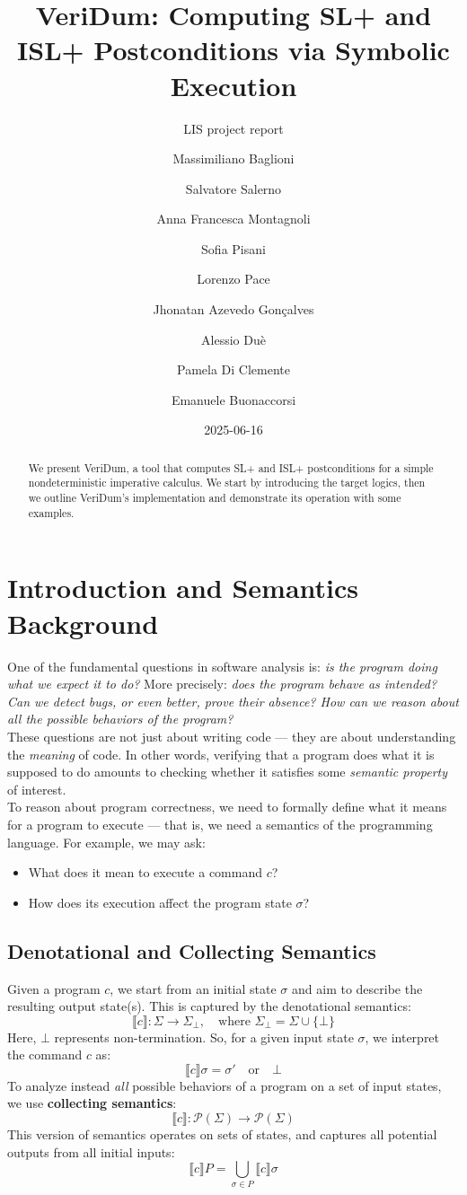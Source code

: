 \documentclass[parskip=half]{scrartcl}
\title{VeriDum: Computing SL+ and ISL+ Postconditions via Symbolic Execution}
\subtitle{LIS project report}
\date{2025-06-16}
\author{ %
  Massimiliano Baglioni      \and
  Salvatore Salerno          \and
  Anna Francesca Montagnoli  \and
  Sofia Pisani               \and
  Lorenzo Pace               \and
  Jhonatan Azevedo Gonçalves \and
  Alessio Duè                \and
  Pamela Di Clemente         \and
  Emanuele Buonaccorsi}
\begin{document}
\maketitle

\begin{abstract}
  We present VeriDum, a tool that computes SL+ and ISL+ postconditions for a simple nondeterministic imperative calculus. We start by introducing the target logics, then we outline VeriDum's implementation and demonstrate its operation with some examples.
\end{abstract}

\section{Introduction and Semantics Background}

One of the fundamental questions in software analysis is: \emph{is the program doing what we expect it to do?} More precisely: \emph{does the program behave as intended? Can we detect bugs, or even better, prove their absence? How can we reason about all the possible behaviors of the program?}
\\ These questions are not just about writing code — they are about understanding the \emph{meaning} of code. In other words, verifying that a program does what it is supposed to do amounts to checking whether it satisfies some \emph{semantic property} of interest.
\\ To reason about program correctness, we need to formally define what it means for a program to execute — that is, we need a semantics of the programming language. For example, we may ask:
\begin{itemize}
    \item What does it mean to execute a command \( c \)?
    \item How does its execution affect the program state \( \sigma \)?
\end{itemize}

\subsection{Denotational and Collecting Semantics}
Given a program \( c \), we start from an initial state \( \sigma \) and aim to describe the resulting output state(s). This is captured by the denotational semantics:
\[
\llbracket c \rrbracket : \Sigma \rightarrow \Sigma_{\bot}, \quad \text{where } \Sigma_{\bot} = \Sigma \cup \{ \bot \}
\]
Here, \( \bot \) represents non-termination. So, for a given input state \( \sigma \), we interpret the command \( c \) as:
\[
\llbracket c \rrbracket \sigma = \sigma' \quad \text{or} \quad \bot
\]
To analyze instead \emph{all} possible behaviors of a program on a set of input states, we use \textbf{collecting semantics}:
\[
\llbracket c \rrbracket : \mathcal{P}(\Sigma) \rightarrow \mathcal{P}(\Sigma)
\]
This version of semantics operates on sets of states, and captures all potential outputs from all initial inputs:
\[
\llbracket c \rrbracket P = \bigcup_{\sigma \in P} \llbracket c \rrbracket \sigma
\]
\end{document}

